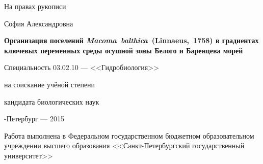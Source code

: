 \newcommand{\sfs}{\fontsize{14pt}{15pt}\selectfont}
\sfs %
\thispagestyle{empty}

\vspace{10mm}
\begin{flushright}
	\Large На правах рукописи 
\end{flushright}

\vspace{30mm}
\begin{center}
{\Large{} София Александровна}
\end{center}

\vspace{30mm}
\begin{center}
{\bf \LARGE Организация поселений {\itshape Macoma~balthica}~(Linnaeus,~1758) в градиентах ключевых переменных среды осушной зоны Белого и Баренцева морей
\par}

\vspace{30mm}
{\Large
Специальность 03.02.10 --- <<Гидробиология>>
}

\vspace{15mm}
\par
{} на соискание учёной степени\par
кандидата биологических наук
\end{center}

\vspace{40mm}
\begin{center}
{-Петербург --- 2015}
\end{center}

\newpage
\thispagestyle{empty}
\noindent Работа выполнена в Федеральном государственном бюджетном образовательном учреждении высшего образования <<Санкт-Петербургский  государственный  университет>>

